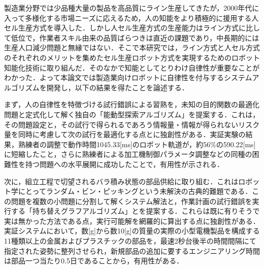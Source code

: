 

製造業分野では少品種大量の製品を高品質にライン生産してきたが，2000年代に入って多様化する市場ニーズに応えるため，人の知能をより積極的に援用する人セル生産方式を導入した．しかし人セル生産方式の生産能力はライン方式に比して低位で，作業者スキル由来の品質ばらつきは直近の課題であり，中長期的には生産人口減少問題と無縁ではない．そこで本研究では，ライン方式と人セル方式のそれぞれのメリットを集めたセル生産ロボット方式を実現するためのロボット知能化技術に取り組んだ．そのなかで知能としてとりわけ自律性が重要なことがわかった．よって本論文では製造業向けロボットに自律性を付与するシステムアルゴリズムを開発し，以下の結果を得たことを論述する．

まず，人の自律性を特徴づける試行錯誤による習熟を，未知の目的関数の最適化問題と定式化して解く独自の「能動型探索アルゴリズム」を提案する．これは，その問題設定と，その試行で得られるであろう情報量・情報が得られないリスク量を同時に考慮して次の試行を最適化する点とに独創性がある．実証実験の結果，熟練者の調整で動作時間1045.33[ms]のロボット軌道が，約56\%の590.22[ms]に短縮したこと，さらに熟練者による加工機制御パラメータ調整などの同種の困難性を持つ問題への水平展開に成功したことで，有用性が示される．

次に，組立工程で切望されるバラ積み状態の部品供給に取り組む．これはロボット学にとってランダム・ビン・ピッキングという未解決の古典的難題である．この問題を複数の小問題に分割して解くシステム解法と，作業計画の試行錯誤を実行する「持ち替えグラフアルゴリズム」とを提案する．これらは既に有りそうで実は無かった方法である点，実行可能解を網羅的に算出する点に独創性がある．実証システムにおいて，数[g]から数10[g]の質量の実際の小型電機製品を構成する11種類以上の金属およびプラスチックの部品を，最速2秒台後半の時間間隔にて指定された姿勢に整列させられ，新規部品の追加に要するエンジニアリング時間は部品一つ当たり0.5日であることから，有用性がある．

\endinput
